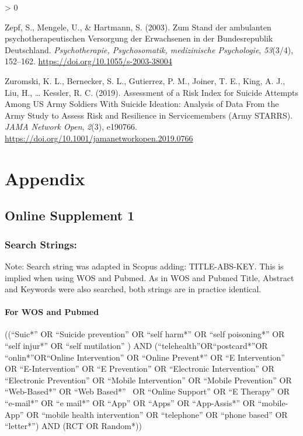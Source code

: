 \documentclass[
  english,
  man]{apa6}
\let\oldparagraph\paragraph
\renewcommand{\paragraph}[1]{\oldparagraph{#1}\mbox{}}
\newlength{\cslhangindent}
\newenvironment{CSLReferences}[2] %
 {%
  \setlength{\parindent}{0pt}
  \ifodd #1 \everypar{\setlength{\hangindent}{\cslhangindent}}\ignorespaces\fi
  \ifnum #2 > 0
  \setlength{\parskip}{#2\baselineskip}
  \fi
 }%
 {}
\begin{document}
\begin{CSLReferences}{1}{0}
\leavevmode\hypertarget{ref-zepf2003}{}%
Zepf, S., Mengele, U., \& Hartmann, S. (2003). Zum Stand der ambulanten psychotherapeutischen Versorgung der Erwachsenen in der Bundesrepublik Deutschland. \emph{Psychotherapie, Psychosomatik, medizinische Psychologie}, \emph{53}(3/4), 152--162. \url{https://doi.org/10.1055/s-2003-38004}

\leavevmode\hypertarget{ref-zuromski2019}{}%
Zuromski, K. L., Bernecker, S. L., Gutierrez, P. M., Joiner, T. E., King, A. J., Liu, H., \ldots{} Kessler, R. C. (2019). Assessment of a {Risk Index} for {Suicide Attempts Among US Army Soldiers With Suicide Ideation}: Analysis of {Data From} the {Army Study} to {Assess Risk} and {Resilience} in {Servicemembers} ({Army STARRS}). \emph{JAMA Network Open}, \emph{2}(3), e190766. \url{https://doi.org/10.1001/jamanetworkopen.2019.0766}

\end{CSLReferences}

\endgroup

\hypertarget{appendix}{%
\section{Appendix}\label{appendix}}

\hypertarget{online-supplement-1}{%
\subsection{Online Supplement 1}\label{online-supplement-1}}

\hypertarget{search-strings}{%
\subsubsection{Search Strings:}\label{search-strings}}

Note: Search string was adapted in Scopus adding: TITLE-ABS-KEY. This is implied when using WOS and Pubmed. As in WOS and Pubmed Title, Abstract and Keywords were also searched, both strings are in practice identical.

\hypertarget{for-wos-and-pubmed}{%
\paragraph{For WOS and Pubmed}\label{for-wos-and-pubmed}}

((``Suic*'' OR ``Suicide prevention'' OR ``self harm*'' OR ``self poisoning*'' OR ``self injur*'' OR ``self mutilation'' ) AND (``telehealth''OR``postcard*''OR ``onlin*''OR``Online Intervention'' OR ``Online Prevent*'' OR ``E Intervention'' OR ``E-Intervention'' OR ``E Prevention'' OR ``Electronic Intervention'' OR ``Electronic Prevention'' OR ``Mobile Intervention'' OR ``Mobile Prevention'' OR ``Web-Based*'' OR ``Web Based*''~ OR ``Online Support'' OR ``E Therapy'' OR ``e-mail*'' OR ``e mail*'' OR ``App'' OR ``Apps'' OR ``App-Assis*'' OR ``mobile-App'' OR ``mobile health intervention'' OR ``telephone'' OR ``phone based'' OR ``letter*'') AND (RCT OR Random*))
\end{document}
